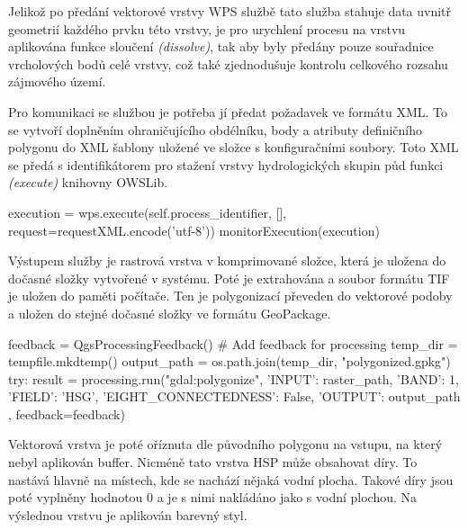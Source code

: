\documentclass[a4paper,oneside,12pt]{book}
\begin{document}
 \hspace{10mm} Jelikož po předání vektorové vrstvy WPS službě tato služba stahuje data uvnitř geometrií každého prvku této vrstvy, je pro urychlení procesu na vrstvu aplikována funkce sloučení \textit{(dissolve)}, tak aby byly předány pouze souřadnice vrcholových bodů celé vrstvy, což také zjednodušuje kontrolu celkového rozsahu zájmového území.

  \hspace{10mm} Pro komunikaci se službou je potřeba jí předat požadavek ve formátu XML. To se vytvoří doplněním ohraničujícího obdélníku, body a atributy definičního polygonu do XML šablony uložené ve složce s konfiguračními soubory. Toto XML se předá s identifikátorem pro stažení vrstvy hydrologických skupin půd funkci \textit{(execute)} knihovny OWSLib.
\begin{pythoncode}[style=mypython, caption={Spuštění komunikace s WPS službou},label={kod:wps}]
execution = wps.execute(self.process_identifier, [], request=requestXML.encode('utf-8'))
monitorExecution(execution)
\end{pythoncode}

\hspace{10mm}Výstupem služby je rastrová vrstva v komprimované složce, která je uložena do dočasné složky vytvořené v systému. Poté je extrahována a soubor formátu TIF je uložen do paměti počítače. Ten je polygonizací převeden do vektorové podoby a uložen do stejné dočasné složky ve formátu GeoPackage.

\begin{pythoncode}[style=mypython, caption={Polygonizace rastrové vrstvy},label={kod:polygonizace}]
feedback = QgsProcessingFeedback()  # Add feedback for processing
        temp_dir = tempfile.mkdtemp()
        output_path = os.path.join(temp_dir, "polygonized.gpkg")
        try:
            result = processing.run("gdal:polygonize", {
                'INPUT': raster_path,
                'BAND': 1,
                'FIELD': 'HSG',
                'EIGHT_CONNECTEDNESS': False,
                'OUTPUT': output_path
            }, feedback=feedback)
\end{pythoncode}

\hspace{10mm}Vektorová vrstva je poté oříznuta dle původního polygonu na vstupu, na který nebyl aplikován buffer. Nicméně tato vrstva HSP může obsahovat díry. To nastává hlavně na místech, kde se nachází nějaká vodní plocha. Takové díry jsou poté vyplněny hodnotou 0 a je s nimi nakládáno jako s vodní plochou. Na výslednou vrstvu je aplikován barevný styl.
\end{document}
